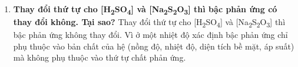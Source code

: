 \begin{enumerate}
    Vận tốc xác định bằng $\frac{\Delta C}{\Delta t}$ vì $\Delta C \approx 0$ (biến thiên nồng độ của lưu huỳnh không đáng kể trong khoảng thời gian $\Delta t$) nên vận tốc trong các thí nghiệm trên được xem là vận tốc tức thời.
    \item \textbf{Thay đổi thứ tự cho [H\textsubscript{2}SO\textsubscript{4}] và [Na\textsubscript{2}S\textsubscript{2}O\textsubscript{3}] thì bậc phản ứng có thay đổi không. Tại sao?}
    Thay đổi thứ tự cho [H\textsubscript{2}SO\textsubscript{4}] và [Na\textsubscript{2}S\textsubscript{2}O\textsubscript{3}] thì bậc phản ứng không thay đổi. Vì ở một nhiệt độ xác định bậc phản ứng chỉ phụ thuộc vào bản chất của hệ (nồng độ, nhiệt độ, diện tích bề mặt, áp suất) mà không phụ thuộc vào thứ tự chất phản ứng.
\end{enumerate}
